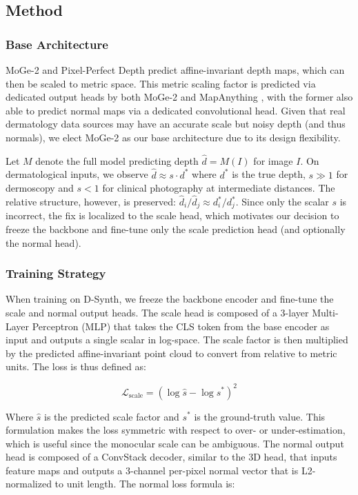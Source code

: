 \documentclass[11pt]{ucthesis}
\begin{document}
\subsection{Method}\label{sec:dd_method}

\subsubsection{Base Architecture}\label{sec:architecture}
MoGe-2 and Pixel-Perfect Depth \cite{wang2025moge2,xu2025pixel} predict affine-invariant depth maps, which can then be scaled to metric space. This metric scaling factor is predicted via dedicated output heads by both MoGe-2 and MapAnything \cite{keetha2026mapanything}, with the former also able to predict normal maps via a dedicated convolutional head. Given that real dermatology data sources may have an accurate scale but noisy depth (and thus normals), we elect MoGe-2 as our base architecture due to its design flexibility.

Let $M$ denote the full model predicting depth $\hat{d} = M(I)$ for image $I$. On dermatological inputs, we observe $\hat{d} \approx s \cdot d^*$ where $d^*$ is the true depth, $s \gg 1$ for dermoscopy and $s < 1$ for clinical photography at intermediate distances. The relative structure, however, is preserved: $\hat{d}_i / \hat{d}_j \approx d^*_i / d^*_j$. Since only the scalar $s$ is incorrect, the fix is localized to the scale head, which motivates our decision to freeze the backbone and fine-tune only the scale prediction head (and optionally the normal head).

\subsubsection{Training Strategy}\label{sec:training}
When training on D-Synth, we freeze the backbone encoder and fine-tune the scale and normal output heads. The scale head is composed of a 3-layer Multi-Layer Perceptron (MLP) that takes the CLS token from the base encoder as input and outputs a single scalar in log-space. The scale factor is then multiplied by the predicted affine-invariant point cloud to convert from relative to metric units. The loss is thus defined as:

\begin{equation}
    \mathcal{L}_{\text{scale}} = \left(\log \hat{s} - \log s^*\right)^2
\end{equation}

\noindent Where $\hat{s}$ is the predicted scale factor and $s^*$ is the ground-truth value. This formulation makes the loss symmetric with respect to over- or under-estimation, which is useful since the monocular scale can be ambiguous. The normal output head is composed of a ConvStack \cite{wang2025moge2} decoder, similar to the 3D head, that inputs feature maps and outputs a 3-channel per-pixel normal vector that is L2-normalized to unit length. The normal loss formula is:
\end{document}
